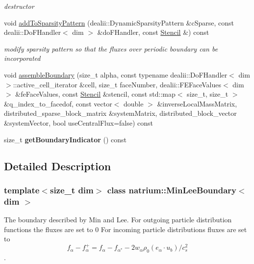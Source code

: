 \begin{DoxyCompactItemize}
\begin{DoxyCompactList}\small\item\em destructor \item\end{DoxyCompactList}\item 
void \hyperlink{classnatrium_1_1MinLeeBoundary_a9d9b16e12b09af906b21cae27102e1c3}{addToSparsityPattern} (dealii::DynamicSparsityPattern \&cSparse, const dealii::DoFHandler$<$ dim $>$ \&doFHandler, const \hyperlink{classnatrium_1_1Stencil}{Stencil} \&) const 
\begin{DoxyCompactList}\small\item\em modify sparsity pattern so that the fluxes over periodic boundary can be incorporated \item\end{DoxyCompactList}\item 
void \hyperlink{classnatrium_1_1MinLeeBoundary_ac23616963c4e9873c2177cdc7f67e159}{assembleBoundary} (size\_\-t alpha, const typename dealii::DoFHandler$<$ dim $>$::active\_\-cell\_\-iterator \&cell, size\_\-t faceNumber, dealii::FEFaceValues$<$ dim $>$ \&feFaceValues, const \hyperlink{classnatrium_1_1Stencil}{Stencil} \&stencil, const std::map$<$ size\_\-t, size\_\-t $>$ \&q\_\-index\_\-to\_\-facedof, const vector$<$ double $>$ \&inverseLocalMassMatrix, distributed\_\-sparse\_\-block\_\-matrix \&systemMatrix, distributed\_\-block\_\-vector \&systemVector, bool useCentralFlux=false) const 
\item 
\hypertarget{classnatrium_1_1MinLeeBoundary_a050f00caec37ee8e2f6e19a4d3d2d1fc}{
size\_\-t {\bfseries getBoundaryIndicator} () const }
\label{classnatrium_1_1MinLeeBoundary_a050f00caec37ee8e2f6e19a4d3d2d1fc}

\end{DoxyCompactItemize}


\subsection{Detailed Description}
\subsubsection*{template$<$size\_\-t dim$>$ class natrium::MinLeeBoundary$<$ dim $>$}

The boundary described by Min and Lee. For outgoing particle distribution functions the fluxes are set to 0 For incoming particle distributions fluxes are set to \[ f_{\alpha} - f^{+}_{\alpha} = f_{\alpha} - f_{\alpha^{*}} - 2w_{\alpha} \rho_{0} (e_{\alpha}\cdot u_{b})/c^{2}_{s}\]. 

